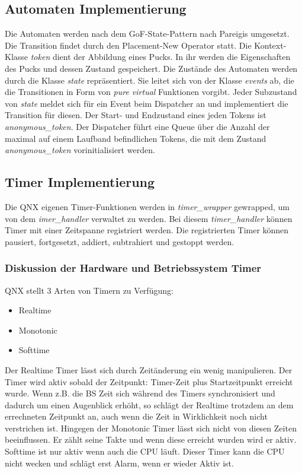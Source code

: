 \documentclass[oneside,a4paper,titlepage]{scrartcl} %
\begin{document}
\subsection{Automaten Implementierung}
Die Automaten werden nach dem GoF-State-Pattern nach Pareigis umgesetzt. Die Transition findet durch den
Placement-New Operator statt. Die Kontext-Klasse \emph{token} dient der Abbildung eines Pucks. In ihr werden die
Eigenschaften des Pucks und dessen Zustand gespeichert.\newline
Die Zustände des Automaten werden durch die Klasse \emph{state} repräsentiert. Sie leitet sich von der Klasse
\emph{events} ab, die die Transitionen in Form von \emph{pure virtual} Funktionen vorgibt.\newline
Jeder Subzustand von \emph{state} meldet sich für ein Event beim Dispatcher an und implementiert die Transition
für diesen.\newline
Der Start- und Endzustand eines jeden Tokens ist \emph{anonymous\_token}.\newline
Der Dispatcher führt eine Queue über die Anzahl der maximal auf einem Laufband befindlichen Tokens, die mit dem Zustand
\emph{anonymous\_token} vorinitialisiert werden.

\subsection{Timer Implementierung}
Die QNX eigenen Timer-Funktionen werden in \emph{timer\_wrapper} gewrapped, um von dem \emph{imer\_handler} 
verwaltet zu werden. Bei diesem \emph{timer\_handler} können Timer mit einer Zeitspanne registriert werden.
Die registrierten Timer können pausiert, fortgesetzt, addiert, subtrahiert und gestoppt werden.
 \subsubsection{Diskussion der Hardware und Betriebssystem Timer}
   QNX stellt 3 Arten von Timern zu Verfügung:
   \begin{itemize}
    \item Realtime
    \item Monotonic
    \item Softtime
   \end{itemize}
   Der Realtime Timer lässt sich durch Zeitänderung ein wenig manipulieren. Der Timer wird aktiv sobald der Zeitpunkt: Timer-Zeit plus Startzeitpunkt erreicht wurde.
   Wenn z.B. die BS Zeit sich während des Timers synchronisiert und dadurch um einen Augenblick erhöht, so schlägt der Realtime trotzdem an dem errechneten Zeitpunkt an, auch wenn die Zeit in Wirklichkeit noch nicht verstrichen ist.
   Hingegen der Monotonic Timer lässt sich nicht von diesen Zeiten beeinflussen. Er zählt seine Takte und wenn diese erreicht wurden wird er aktiv.
   Softtime ist nur aktiv wenn auch die CPU läuft. Dieser Timer kann die CPU nicht wecken und schlägt erst Alarm, wenn er wieder Aktiv ist.
\end{document}
